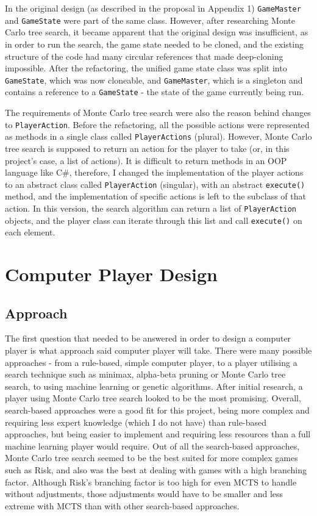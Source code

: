 In the original design (as described in the proposal in Appendix 1) \texttt{GameMaster} and \texttt{GameState} were part of the same class. However, after researching Monte Carlo tree search, it became apparent that the original design was insufficient, as in order to run the search, the game state needed to be cloned, and the existing structure of the code had many circular references that made deep-cloning impossible. After the refactoring, the unified game state class was split into \texttt{GameState}, which was now cloneable, and \texttt{GameMaster}, which is a singleton and contains a reference to a \texttt{GameState} - the state of the game currently being run.

The requirements of Monte Carlo tree search were also the reason behind changes to \texttt{PlayerAction}. Before the refactoring, all the possible actions were represented as methods in a single class called \texttt{PlayerActions} (plural). However, Monte Carlo tree search is supposed to return an action for the player to take (or, in this project's case, a list of actions). It is difficult to return methods in an OOP language like C\#, therefore, I changed the implementation of the player actions to an abstract class called \texttt{PlayerAction} (singular), with an abstract \texttt{execute()} method, and the implementation of specific actions is left to the subclass of that action. In this version, the search algorithm can return a list of \texttt{PlayerAction} objects, and the player class can iterate through this list and call \texttt{execute()} on each element.

\section{Computer Player Design}
\label{computerPlayerDesign}
\subsection{Approach}
The first question that needed to be answered in order to design a computer player is what approach said computer player will take. There were many possible approaches - from a rule-based, simple computer player, to a player utilising a search technique such as minimax, alpha-beta pruning or Monte Carlo tree search, to using machine learning or genetic algorithms. After initial research, a player using Monte Carlo tree search looked to be the most promising. Overall, search-based approaches were a good fit for this project, being more complex and requiring less expert knowledge (which I do not have) than rule-based approaches, but being easier to implement and requiring less resources than a full machine learning player would require. Out of all the search-based approaches, Monte Carlo tree search seemed to be the best suited for more complex games such as Risk, and also was the best at dealing with games with a high branching factor. Although Risk's branching factor is too high for even MCTS to handle without adjustments\cite{bauer2023artificial}, those adjustments would have to be smaller and less extreme with MCTS than with other search-based approaches.

